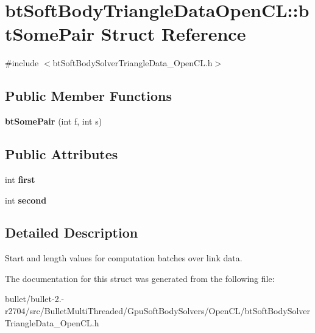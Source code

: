 \hypertarget{structbt_soft_body_triangle_data_open_c_l_1_1bt_some_pair}{\section{bt\+Soft\+Body\+Triangle\+Data\+Open\+C\+L\+:\+:bt\+Some\+Pair Struct Reference}
\label{structbt_soft_body_triangle_data_open_c_l_1_1bt_some_pair}
}


{\ttfamily \#include $<$bt\+Soft\+Body\+Solver\+Triangle\+Data\+\_\+\+Open\+C\+L.\+h$>$}

\subsection*{Public Member Functions}
\begin{DoxyCompactItemize}
\item 
\hypertarget{structbt_soft_body_triangle_data_open_c_l_1_1bt_some_pair_ab3fe41e6a20ee489aabd8d47b4d013c2}{{\bfseries bt\+Some\+Pair} (int f, int s)}\label{structbt_soft_body_triangle_data_open_c_l_1_1bt_some_pair_ab3fe41e6a20ee489aabd8d47b4d013c2}

\end{DoxyCompactItemize}
\subsection*{Public Attributes}
\begin{DoxyCompactItemize}
\item 
\hypertarget{structbt_soft_body_triangle_data_open_c_l_1_1bt_some_pair_a68a587fefa4bc96720878af0f1c3a157}{int {\bfseries first}}\label{structbt_soft_body_triangle_data_open_c_l_1_1bt_some_pair_a68a587fefa4bc96720878af0f1c3a157}

\item 
\hypertarget{structbt_soft_body_triangle_data_open_c_l_1_1bt_some_pair_a78df6466d7daf32d7418c1ebb01e0908}{int {\bfseries second}}\label{structbt_soft_body_triangle_data_open_c_l_1_1bt_some_pair_a78df6466d7daf32d7418c1ebb01e0908}

\end{DoxyCompactItemize}


\subsection{Detailed Description}
Start and length values for computation batches over link data. 

The documentation for this struct was generated from the following file\+:\begin{DoxyCompactItemize}
\item 
bullet/bullet-\/2.-\/r2704/src/\+Bullet\+Multi\+Threaded/\+Gpu\+Soft\+Body\+Solvers/\+Open\+C\+L/bt\+Soft\+Body\+Solver\+Triangle\+Data\+\_\+\+Open\+C\+L.\+h\end{DoxyCompactItemize}
